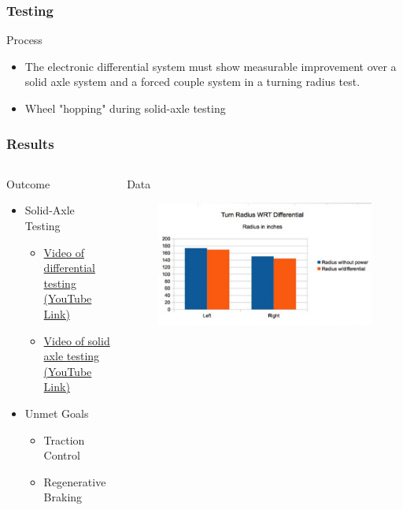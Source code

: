 \documentclass{beamer}
\begin{document}
\begin{frame}
	\frametitle{Testing}
		\begin{block}{Process}
			\begin{itemize}
				\item The electronic differential system must show measurable improvement over a solid axle system and a forced couple system in a turning radius test. 
				\item Wheel "hopping" during solid-axle testing
			\end{itemize}
		\end{block}
\end{frame}
\begin{frame}
	\frametitle{Results}
	\begin{columns}[T]
		\begin{column}{0.5\textwidth}
			\begin{block}{Outcome}
				\begin{itemize}
					\item Solid-Axle Testing
					\begin{itemize}
						\item \href{http://youtu.be/F0vOdHwFx1o}{Video of differential testing (YouTube Link)}
						\item \href{http://youtu.be/mY3hA6xaVb8}{Video of solid axle testing (YouTube Link)} 
					\end{itemize}
					\item Unmet Goals
					\begin{itemize}
						\item Traction Control
						\item Regenerative Braking
					\end{itemize}
				\end{itemize}
			\end{block}
		\end{column}		
		\begin{column}{0.5\textwidth}
			\begin{block}{Data}
				\begin{figure}
					\centering
					\includegraphics[scale=.4]{figures/results.pdf}
				\end{figure}
			\end{block}	
		\end{column}
	\end{columns}		
\end{frame}
\end{document}
